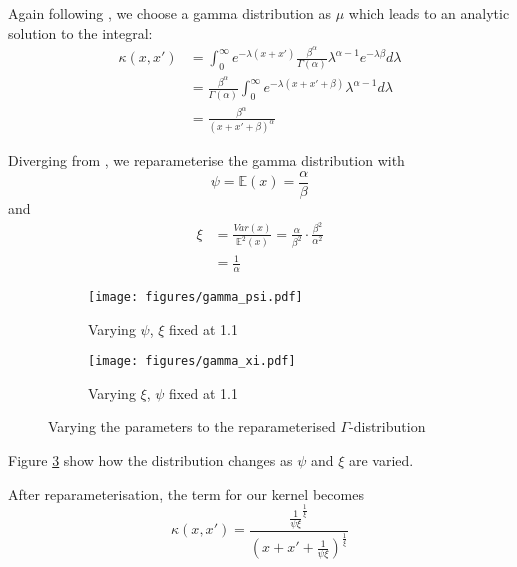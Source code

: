 \documentclass[a4paper,12pt,twoside,openright]{report}
\begin{document}
Again following \cite{2014arXiv1406.3896S}, we choose a gamma distribution as $\mu$ which leads to an analytic solution to the integral:
\begin{align}
\kappa(x, x') &= \int_0^{\infty} e^{-\lambda(x+x')}\frac{\beta^\alpha}{\Gamma(\alpha)}\lambda^{\alpha -1}e^{-\lambda\beta} d\lambda\\
&=\frac{\beta^\alpha}{\Gamma(\alpha)}\int_0^\infty e^{-\lambda(x+x'+\beta)}\lambda^{\alpha-1}d\lambda\\
&=\frac{\beta^\alpha}{(x+x'+\beta)^\alpha}
\end{align}

Diverging from \cite{2014arXiv1406.3896S}, we reparameterise the gamma distribution with
\begin{equation}
\psi = \mathbb{E}(x) = \frac{\alpha}{\beta}
\end{equation}
and
\begin{align}
\xi &= \frac{Var(x)}{\mathbb{E}^2 (x)} = \frac{\alpha}{\beta^2} \cdot \frac{\beta^2}{\alpha^2}\\
&= \frac{1}{\alpha}
\end{align}

\begin{figure}
\centering
\begin{subfigure}{.5\textwidth}
  \centering
  \texttt{[image: figures/gamma\_psi.pdf]}
  \caption{Varying $\psi$, $\xi$ fixed at 1.1}
  \label{gammapsi}
\end{subfigure}%
\begin{subfigure}{.5\textwidth}
  \centering
  \texttt{[image: figures/gamma\_xi.pdf]}
  \caption{Varying $\xi$, $\psi$ fixed at 1.1}
  \label{gammaxi}
\end{subfigure}
\caption{Varying the parameters to the reparameterised $\Gamma$-distribution}
\label{gammadist}
\end{figure}


Figure \ref{gammadist} show how the distribution changes as $\psi$ and $\xi$ are varied.

After reparameterisation, the term for our kernel becomes
\begin{equation}
\kappa(x, x') = \frac{\frac{1}{\psi\xi}^{\frac{1}{\xi}}}{(x+x'+\frac{1}{\psi\xi})^{\frac{1}{\xi}}}
\end{equation}
\end{document}

